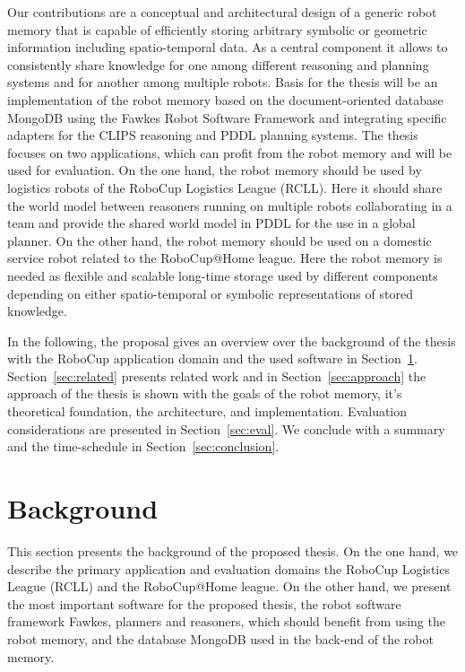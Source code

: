 \documentclass[a4paper,11pt]{article}
\newcommand{\refsec}[1]{Section~\ref{#1}}
\begin{document}
Our contributions are a conceptual and architectural design of a
generic robot memory that is capable of efficiently storing arbitrary
symbolic or geometric information including spatio-temporal data. As a
central component it allows to consistently share knowledge for one
among different reasoning and planning systems and for another among
multiple robots. Basis for the thesis will be an implementation of the
robot memory based on the document-oriented database MongoDB using the
Fawkes Robot Software Framework and integrating specific adapters for
the CLIPS reasoning and PDDL planning systems. The thesis focuses on
two applications, which can profit from the robot memory and will be
used for evaluation. On the one hand, the robot memory should be used
by logistics robots of the RoboCup Logistics League (RCLL). Here it
should share the world model between reasoners running on multiple
robots collaborating in a team and provide the shared world model in
PDDL for the use in a global planner. On the other hand, the robot
memory should be used on a domestic service robot related to the
RoboCup@Home league. Here the robot memory is needed as flexible and
scalable long-time storage used by different components depending on
either spatio-temporal or symbolic representations of stored
knowledge.

In the following, the proposal gives an overview over the background
of the thesis with the RoboCup application domain and the used
software in \refsec{sec:background}. \refsec{sec:related} presents
related work and in \refsec{sec:approach} the approach of the thesis
is shown with the goals of the robot memory, it's theoretical
foundation, the architecture, and implementation. Evaluation
considerations are presented in \refsec{sec:eval}. We conclude with a
summary and the time-schedule in \refsec{sec:conclusion}.


\section{Background}
\label{sec:background}
This section presents the background of the proposed thesis. On the
one hand, we describe the primary application and evaluation domains
the RoboCup Logistics League (RCLL) and the RoboCup@Home league.
On the other hand, we present
the most important software for the proposed thesis,
the robot software framework Fawkes, planners and
reasoners, which should benefit from using the robot memory, and
the database MongoDB used in the back-end of the robot memory.
\end{document}
